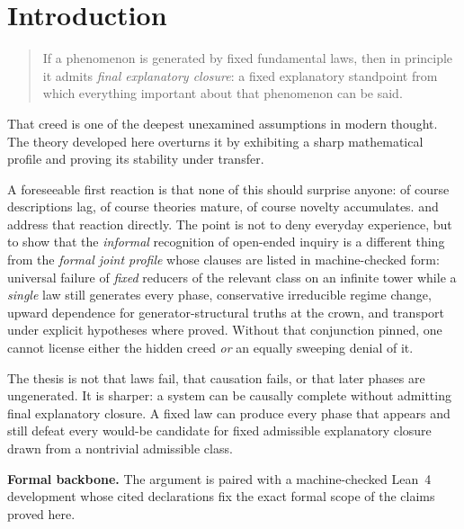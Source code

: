 \documentclass[11pt,a4paper]{article}
\theoremstyle{definition}
\begin{document}
\section{Introduction}\label{sec:intro}

\begin{quote}
If a phenomenon is generated by fixed fundamental laws, then in principle it admits \emph{final explanatory closure}: a fixed explanatory standpoint from which everything important about that phenomenon can be said.
\end{quote}

That creed is one of the deepest unexamined assumptions in modern thought. The theory developed here overturns it by exhibiting a sharp mathematical profile and proving its stability under transfer.

\smallskip
\noindent
A foreseeable first reaction is that none of this should surprise anyone: of course descriptions lag, of course theories mature, of course novelty accumulates.  and  address that reaction directly. The point is not to deny everyday experience, but to show that the \emph{informal} recognition of open-ended inquiry is a different thing from the \emph{formal joint profile} whose clauses are listed in machine-checked form: universal failure of \emph{fixed} reducers of the relevant class on an infinite tower while a \emph{single} law still generates every phase, conservative irreducible regime change, upward dependence for generator-structural truths at the crown, and transport under explicit hypotheses where proved. Without that conjunction pinned, one cannot license either the hidden creed \emph{or} an equally sweeping denial of it.

The thesis is not that laws fail, that causation fails, or that later phases are ungenerated. It is sharper: a system can be causally complete without admitting final explanatory closure. A fixed law can produce every phase that appears and still defeat every would-be candidate for fixed admissible explanatory closure drawn from a nontrivial admissible class.

\smallskip
\noindent
\textbf{Formal backbone.} The argument is paired with a machine-checked Lean~4 development whose cited declarations fix the exact formal scope of the claims proved here.
\end{document}
